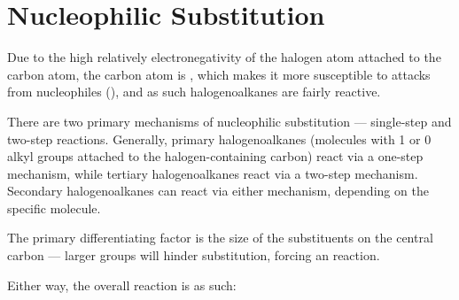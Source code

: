 









































	\pagebreak
	\hypertarget{AppendixNucleophilicSubstitution}{}
	\section{Nucleophilic Substitution}

		Due to the high relatively electronegativity of the halogen atom attached to the carbon atom, the carbon atom is
		, which makes it more susceptible to attacks from nucleophiles (), and
		as such halogenoalkanes are fairly reactive.

		There are two primary mechanisms of nucleophilic substitution --- single-step and two-step reactions. Generally, primary
		halogenoalkanes (molecules with 1 or 0 alkyl groups attached to the halogen-containing carbon) react via a one-step
		mechanism, while tertiary halogenoalkanes react via a two-step mechanism. Secondary halogenoalkanes can react via either
		mechanism, depending on the specific molecule.

		The primary differentiating factor is the size of the substituents on the central carbon --- larger groups will hinder
		\sntwo{} substitution, forcing an \snone{} reaction.

		Either way, the overall reaction is as such:


